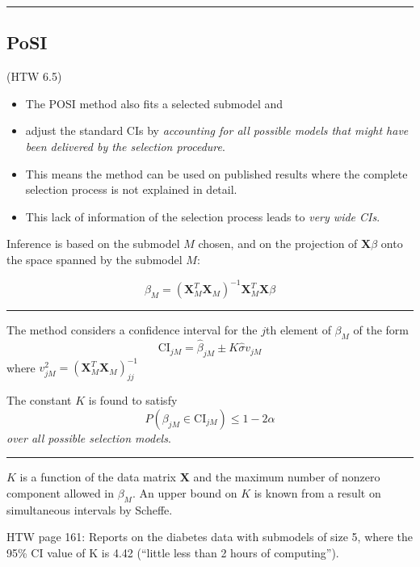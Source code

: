 \documentclass[
  letterpaper,
  DIV=11,
  numbers=noendperiod]{scrartcl}
\providecommand{\tightlist}{%
  \setlength{\itemsep}{0pt}\setlength{\parskip}{0pt}}\usepackage{longtable,booktabs,array}
\begin{document}
\begin{center}\rule{0.5\linewidth}{0.5pt}\end{center}

\hypertarget{posi}{%
\subsection{PoSI}\label{posi}}

(HTW 6.5)

\begin{itemize}
\tightlist
\item
  The POSI method also fits a selected submodel and
\item
  adjust the standard CIs by \emph{accounting for all possible models
  that might have been delivered by the selection procedure}.
\item
  This means the method can be used on published results where the
  complete selection process is not explained in detail.
\item
  This lack of information of the selection process leads to \emph{very
  wide CIs}.
\end{itemize}

Inference is based on the submodel \(M\) chosen, and on the projection
of \({\boldsymbol X} \beta\) onto the space spanned by the submodel
\(M\):

\[\beta_M=({\boldsymbol X}_M^T{\boldsymbol X}_M)^{-1}{\boldsymbol X}_M^T{\boldsymbol X} \beta\]

\begin{center}\rule{0.5\linewidth}{0.5pt}\end{center}

The method considers a confidence interval for the \(j\)th element of
\(\beta_M\) of the form
\[\text{CI}_{jM}=\hat{\beta}_{jM}\pm K \hat{\sigma}v_{jM}\] where
\(v_{jM}^2=({\boldsymbol X}_M^T{\boldsymbol X}_M)^{-1}_{jj}\)

The constant \(K\) is found to satisfy
\[ P(\beta_{jM}\in \text{CI}_{jM}) \le 1-2\alpha\] \emph{over all
possible selection models}.

\begin{center}\rule{0.5\linewidth}{0.5pt}\end{center}

\(K\) is a function of the data matrix \({\boldsymbol X}\) and the
maximum number of nonzero component allowed in \(\beta_M\). An upper
bound on \(K\) is known from a result on simultaneous intervals by
Scheffe.

HTW page 161: Reports on the diabetes data with submodels of size 5,
where the 95\% CI value of K is 4.42 (``little less than 2 hours of
computing'').
\end{document}
